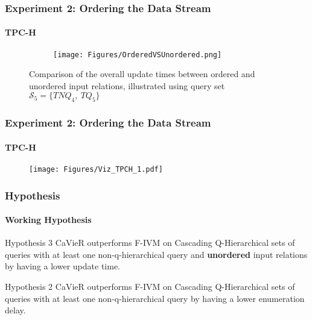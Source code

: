 \documentclass[
	11pt, %
]{beamer}
\begin{document}
\begin{frame}
	\frametitle{Experiment 2: Ordering the Data Stream}
	\framesubtitle{TPC-H}
	\begin{figure}


		\begin{minipage}{0.25\textwidth}
		\end{minipage}
		\begin{minipage}{0.74\textwidth}
			\begin{figure}
				\centering
				\texttt{[image: Figures/OrderedVSUnordered.png]}
			\end{figure}
		\end{minipage}
		\caption{Comparison of the overall update times between ordered and unordered input relations, illustrated using query set $\mathcal{S}_5 = \{TNQ_4,\ TQ_5\}$}
		\label{fig:orderedVSunordered}
	\end{figure}
\end{frame}

\begin{frame}
	\frametitle{Experiment 2: Ordering the Data Stream}
	\framesubtitle{TPC-H}
	\begin{figure}
		\texttt{[image: Figures/Viz\_TPCH\_1.pdf]}
	\end{figure}
\end{frame}

\begin{frame}
	\frametitle{Hypothesis}
	\framesubtitle{Working Hypothesis}
	\begin{block}{Hypothesis 3}
			CaVieR outperforms F-IVM on Cascading Q-Hierarchical sets of queries with at least one non-q-hierarchical query and \textbf{unordered} input relations by having a lower update time.
	\end{block}
		\begin{block}{Hypothesis 2}
		CaVieR outperforms F-IVM on Cascading Q-Hierarchical sets of queries with at least one non-q-hierarchical query by having a lower enumeration delay.
	\end{block}
	
\end{frame}
\end{document}
